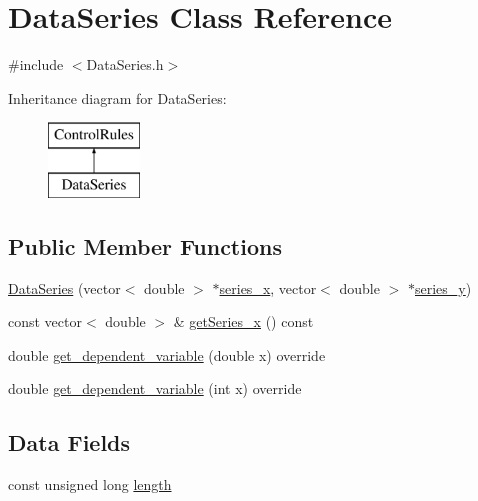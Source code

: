 \hypertarget{classDataSeries}{}\section{Data\+Series Class Reference}
\label{classDataSeries}


{\ttfamily \#include $<$Data\+Series.\+h$>$}

Inheritance diagram for Data\+Series\+:\begin{figure}[H]
\begin{center}
\leavevmode
\includegraphics[height=2.000000cm]{classDataSeries}
\end{center}
\end{figure}
\subsection*{Public Member Functions}
\begin{DoxyCompactItemize}
\item 
\mbox{\hyperlink{classDataSeries_a8af4ff388a574c8b836c2880492a8423_a8af4ff388a574c8b836c2880492a8423}{Data\+Series}} (vector$<$ double $>$ $\ast$\mbox{\hyperlink{classDataSeries_ac49042cab004e46a8183cc10183fbfcd_ac49042cab004e46a8183cc10183fbfcd}{series\+\_\+x}}, vector$<$ double $>$ $\ast$\mbox{\hyperlink{classDataSeries_a4a8cff07f177a4787904ed1cd746bf23_a4a8cff07f177a4787904ed1cd746bf23}{series\+\_\+y}})
\item 
const vector$<$ double $>$ \& \mbox{\hyperlink{classDataSeries_a0a1f6248bc7bed18587e28f307066307_a0a1f6248bc7bed18587e28f307066307}{get\+Series\+\_\+x}} () const
\item 
double \mbox{\hyperlink{classDataSeries_a3cb684ebcbdd6d9969996f306bed8b53_a3cb684ebcbdd6d9969996f306bed8b53}{get\+\_\+dependent\+\_\+variable}} (double x) override
\item 
double \mbox{\hyperlink{classDataSeries_a57c3737304a489a3ae9cae5910fc5337_a57c3737304a489a3ae9cae5910fc5337}{get\+\_\+dependent\+\_\+variable}} (int x) override
\end{DoxyCompactItemize}
\subsection*{Data Fields}
\begin{DoxyCompactItemize}
\item 
const unsigned long \mbox{\hyperlink{classDataSeries_ad4a99b265519d2f57b787c03f2cf2f83_ad4a99b265519d2f57b787c03f2cf2f83}{length}}
\end{DoxyCompactItemize}

